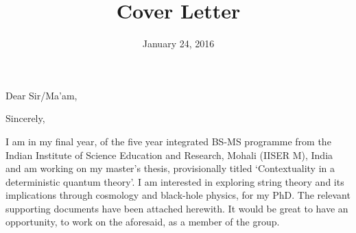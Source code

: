 \documentclass[11pt,a4paper,sans]{moderncv}        %
\title{Cover Letter}                               %
\begin{document}
\date{January 24, 2016}
\opening{Dear Sir/Ma'am,}
\closing{Sincerely,}

\makelettertitle

I am in my final year, of the five year integrated BS-MS programme from the Indian Institute of Science Education and Research, Mohali (IISER M), India and am working on my master's thesis, provisionally titled `Contextuality in a deterministic quantum theory'. I am interested in exploring string theory and its implications through cosmology and black-hole physics, for my PhD. The relevant supporting documents have been attached herewith. It would be great to have an opportunity, to work on the aforesaid, as a member of the group.

\makeletterclosing
\end{document}
